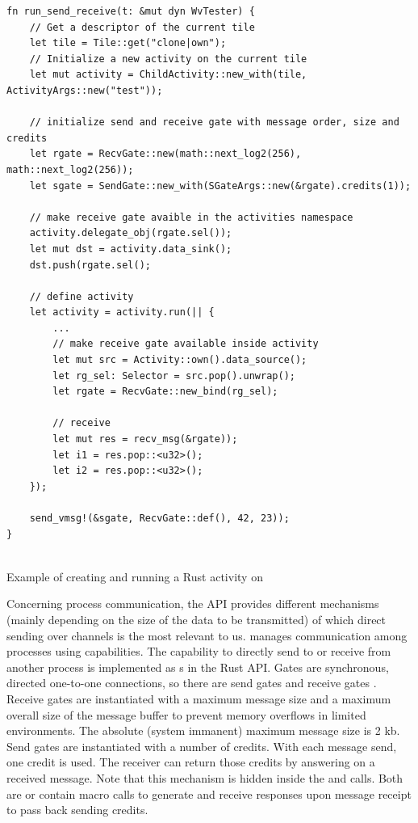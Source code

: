 \begin{codefigure}[ht]
    \centering
    \begin{verbatim}
fn run_send_receive(t: &mut dyn WvTester) {
    // Get a descriptor of the current tile
    let tile = Tile::get("clone|own");
    // Initialize a new activity on the current tile
    let mut activity = ChildActivity::new_with(tile, ActivityArgs::new("test"));

    // initialize send and receive gate with message order, size and credits 
    let rgate = RecvGate::new(math::next_log2(256), math::next_log2(256));
    let sgate = SendGate::new_with(SGateArgs::new(&rgate).credits(1));

    // make receive gate avaible in the activities namespace
    activity.delegate_obj(rgate.sel());
    let mut dst = activity.data_sink();
    dst.push(rgate.sel();

    // define activity 
    let activity = activity.run(|| {
        ...
        // make receive gate available inside activity
        let mut src = Activity::own().data_source();
        let rg_sel: Selector = src.pop().unwrap();
        let rgate = RecvGate::new_bind(rg_sel);

        // receive 
        let mut res = recv_msg(&rgate));
        let i1 = res.pop::<u32>();
        let i2 = res.pop::<u32>();
    });

    send_vmsg!(&sgate, RecvGate::def(), 42, 23));
}
    
    \end{verbatim}
    \caption{Example of creating and running a Rust activity on \md}
    \label{fig:startingActivity}
\end{codefigure}

Concerning process communication, the API provides different mechanisms (mainly depending on the size of the data to be transmitted) of which direct sending over channels is the most relevant to us. \md manages communication among processes using capabilities. The capability to directly send to or receive from another process is implemented as s in the \md Rust API. Gates are synchronous, directed one-to-one connections, so there are send gates  and receive gates . Receive gates are instantiated with a maximum message size and a maximum overall size of the message buffer to prevent memory overflows in limited environments. The absolute (system immanent) maximum message size is 2 kb. Send gates are instantiated with a number of credits. With each message send, one credit is used. The receiver can return those credits by answering on a received message. Note that this mechanism is hidden inside the  and  calls. Both are or contain macro calls to generate and receive responses upon message receipt to pass back sending credits. \\

